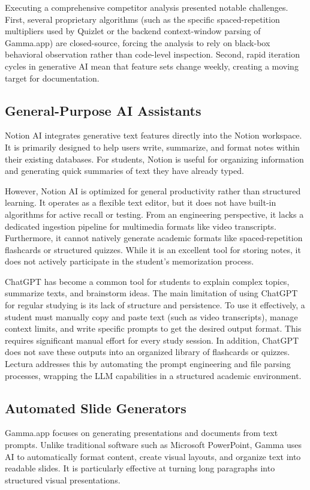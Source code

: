 Executing a comprehensive competitor analysis presented notable challenges. First, several proprietary algorithms (such as the specific spaced-repetition multipliers used by Quizlet or the backend context-window parsing of Gamma.app) are closed-source, forcing the analysis to rely on black-box behavioral observation rather than code-level inspection. Second, rapid iteration cycles in generative AI mean that feature sets change weekly, creating a moving target for documentation.

\subsection{General-Purpose AI Assistants}
Notion AI integrates generative text features directly into the Notion workspace. It is primarily designed to help users write, summarize, and format notes within their existing databases. For students, Notion is useful for organizing information and generating quick summaries of text they have already typed.

However, Notion AI is optimized for general productivity rather than structured learning. It operates as a flexible text editor, but it does not have built-in algorithms for active recall or testing. From an engineering perspective, it lacks a dedicated ingestion pipeline for multimedia formats like video transcripts. Furthermore, it cannot natively generate academic formats like spaced-repetition flashcards or structured quizzes. While it is an excellent tool for storing notes, it does not actively participate in the student's memorization process.

ChatGPT has become a common tool for students to explain complex topics, summarize texts, and brainstorm ideas. The main limitation of using ChatGPT for regular studying is its lack of structure and persistence. To use it effectively, a student must manually copy and paste text (such as video transcripts), manage context limits, and write specific prompts to get the desired output format. This requires significant manual effort for every study session. In addition, ChatGPT does not save these outputs into an organized library of flashcards or quizzes. Lectura addresses this by automating the prompt engineering and file parsing processes, wrapping the LLM capabilities in a structured academic environment.

\subsection{Automated Slide Generators}
Gamma.app focuses on generating presentations and documents from text prompts. Unlike traditional software such as Microsoft PowerPoint, Gamma uses AI to automatically format content, create visual layouts, and organize text into readable slides. It is particularly effective at turning long paragraphs into structured visual presentations.

